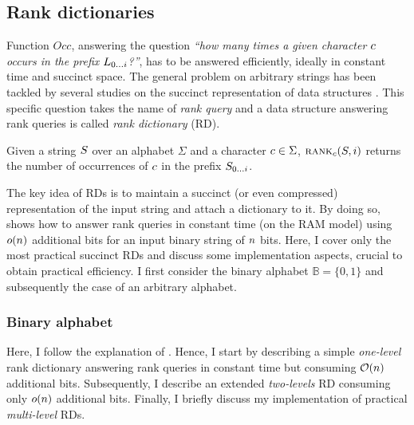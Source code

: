 \subsection{Rank dictionaries}
\label{sec:index:succinct:rd}

Function $Occ$, answering the question \emph{``how many times a given character $c$ occurs in the prefix ${L}_{{0}\dots{i}}$?''}, has to be answered efficiently, ideally in constant time and succinct space.
The general problem on arbitrary strings has been tackled by several studies on the succinct representation of data structures \citep{Jacobson1989}.
This specific question takes the name of \emph{rank query} and a data structure answering rank queries is called \emph{rank dictionary} (RD).

\begin{definition}
Given a string $S$ over an alphabet $\Sigma$ and a character $c \in \Sigma$, $\textsc{rank}_{c}(S, i)$ returns the number of occurrences of $c$ in the prefix ${S}_{{0}\dots{i}}$.
\end{definition}

The key idea of RDs is to maintain a succinct (or even compressed) representation of the input string and attach a dictionary to it.
By doing so, \cite{Jacobson1989} shows how to answer rank queries in constant time (on the RAM model) using $o(n)$ additional bits for an input binary string of $n$ bits.
Here, I cover only the most practical succinct RDs and discuss some implementation aspects, crucial to obtain practical efficiency.
I first consider the binary alphabet $\mathbb{B} = \{ 0, 1 \}$ and subsequently the case of an arbitrary alphabet.

\subsubsection{Binary alphabet}
\label{sec:index:rd:binary}

Here, I follow the explanation of \citep{Navarro2007}.
Hence, I start by describing a simple \emph{one-level} rank dictionary answering rank queries in constant time but consuming $\mathcal{O}(n)$ additional bits.
Subsequently, I describe an extended \emph{two-levels} RD consuming only $o(n)$ additional bits.
Finally, I briefly discuss my implementation of practical \emph{multi-level} RDs.


